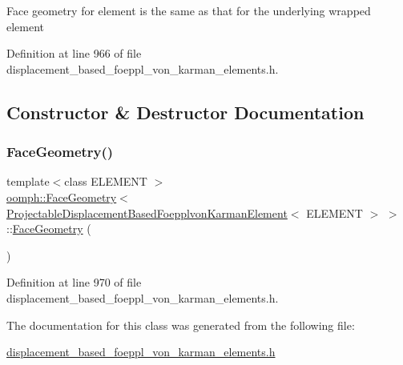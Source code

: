 Face geometry for element is the same as that for the underlying wrapped element 

Definition at line 966 of file displacement\+\_\+based\+\_\+foeppl\+\_\+von\+\_\+karman\+\_\+elements.\+h.



\subsection{Constructor \& Destructor Documentation}
\mbox{\label{classoomph_1_1FaceGeometry_3_01ProjectableDisplacementBasedFoepplvonKarmanElement_3_01ELEMENT_01_4_01_4_a6e379585ea779f4c6d0c8ce2590764bd}} 
\subsubsection{\texorpdfstring{Face\+Geometry()}{FaceGeometry()}}
{\footnotesize\ttfamily template$<$class E\+L\+E\+M\+E\+NT $>$ \\
\hyperlink{classoomph_1_1FaceGeometry}{oomph\+::\+Face\+Geometry}$<$ \hyperlink{classoomph_1_1ProjectableDisplacementBasedFoepplvonKarmanElement}{Projectable\+Displacement\+Based\+Foepplvon\+Karman\+Element}$<$ E\+L\+E\+M\+E\+NT $>$ $>$\+::\hyperlink{classoomph_1_1FaceGeometry}{Face\+Geometry} (\begin{DoxyParamCaption}{ }\end{DoxyParamCaption})\hspace{0.3cm}{\ttfamily [inline]}}



Definition at line 970 of file displacement\+\_\+based\+\_\+foeppl\+\_\+von\+\_\+karman\+\_\+elements.\+h.



The documentation for this class was generated from the following file\+:\begin{DoxyCompactItemize}
\item 
\hyperlink{displacement__based__foeppl__von__karman__elements_8h}{displacement\+\_\+based\+\_\+foeppl\+\_\+von\+\_\+karman\+\_\+elements.\+h}\end{DoxyCompactItemize}
